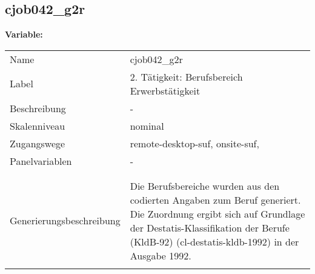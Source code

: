 	
	
	\subsection{cjob042\_g2r}
	\label{subSection:cjob042_g2r}

	\noindent\textbf{Variable:}\\
		\begin{tabular}{lL{11.3cm}}
			\label{tableVariable:cjob042_g2r}
			Name & cjob042\_g2r \\
			Label & 2. Tätigkeit: Berufsbereich Erwerbstätigkeit \\
			Beschreibung & - \\
			Skalenniveau & nominal \\
			Zugangswege &
				remote-desktop-suf,
				onsite-suf,
 \\
			Panelvariablen & -
			 \\
			 \\
 \\
					Generierungsbeschreibung & Die Berufsbereiche wurden aus den codierten Angaben zum Beruf generiert. Die Zuordnung ergibt sich auf Grundlage der Destatis-Klassifikation der Berufe (KldB-92) (cl-destatis-kldb-1992) in der Ausgabe 1992. 
				 \\	
			 \\
		\end{tabular}






